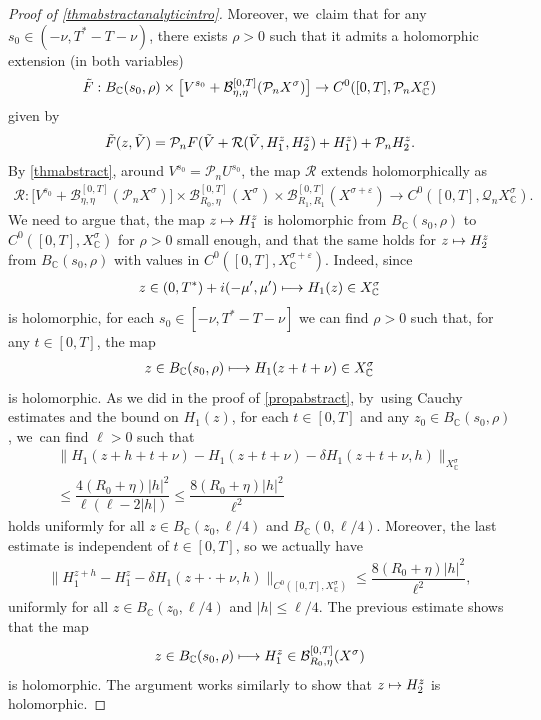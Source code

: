 \documentclass[10pt]{amsart}
\newcommand\mto{\mathchoice{\longmapsto}{\mapsto}{\mapsto}{\mapsto}}
\theoremstyle{definition}
\let\mc\mathcal
\let\veps\varepsilon
\newcommand{\B}{\mc{B}}
\newcommand{\Q}{\mathcal{Q}}
\renewcommand{\P}{\mathcal{P}}
\providecommand{\norm}[1]{\lVert#1\rVert}
\begin{document}
\begin{proof}[Proof of \cref{thmabstractanalyticintro}]
Moreover, we~claim that for any $s_0\in (-\nu,T^*-T-\nu)$, there exists $\rho>0$ such that it admits a holomorphic extension (in both variables)
\begin{align*}
\Tilde{F}: B_{\mathbb{C}}(s_0, \rho)\times \bigl[V^{s_0}+\B_{\eta,\eta}^{[0,T]}(\P_n X^{\sigma})\bigr]\to C^0([0, T], \P_n X_\mathbb{C}^\sigma)
\end{align*}
given by
\begin{align*}
\Tilde{F}(z,\Tilde{V})=\P_n F(\Tilde{V}+\mathcal{R}(\Tilde{V},H_{1}^z,H_{2}^z)+H_{1}^z)+\P_n H_{2}^z.
\end{align*}
By \cref{thmabstract}, around $V^{s_0}=\P_n U^{s_0}$, the map $\mc{R}$ extends holomorphically as
\begin{align*}
\mathcal{R}: \bigl[ V^{s_0}+ \B_{\eta,\eta}^{[0,T]}(\P_n X^{\sigma})\bigr] \times \B_{R_{0},\eta}^{[0,T]}(X^{\sigma}) \times \B_{R_{1},R_{1}}^{[0,T]}(X^{\sigma+\veps}) \to C^0([0, T], \Q_{n }X_\mathbb{C}^{\sigma}).
\end{align*}
We need to argue that, the map $z\mto H_1^z$ is holomorphic from $B_{\mathbb{C}}(s_0, \rho)$ to $C^0([0, T], X_\mathbb{C}^\sigma)$ for $\rho>0$ small enough, and that the same holds for $z\mto H_2^z$ from $B_{\mathbb{C}}(s_0, \rho)$ with values in $C^0([0, T], X_\mathbb{C}^{\sigma+\veps})$. Indeed, since
\begin{align*}
z\in (0, T^*)+i(-\mu', \mu')\mto H_1(z)\in X_\mathbb{C}^\sigma
\end{align*}
is holomorphic, for each $s_0\in [-\nu, T^*-T-\nu]$ we can find $\rho>0$ such that, for any $t\in [0, T]$, the map
\begin{align*}
z\in B_\mathbb{C}(s_0, \rho)\mto H_1(z+t+\nu)\in X_\mathbb{C}^\sigma
\end{align*}
is holomorphic. As we did in the proof of \cref{propabstract}, by~using Cauchy estimates and the bound on $H_1(z)$, for each $t\in [0, T]$ and any $z_0\in B_\mathbb{C}(s_0, \rho)$, we~can find $\ell>0$ such that
\begin{multline*}
\norm{H_1(z+h+t+\nu)-H_1(z+t+\nu)-\delta H_1(z+t+\nu, h)}_{X_\mathbb{C}^\sigma}\\
\leq \dfrac{4(R_0+\eta)|h|^2}{\ell(\ell-2|h|)}\leq \dfrac{8(R_0+\eta)|h|^2}{\ell^2}
\end{multline*}
holds uniformly for all $z\in B_\mathbb{C}(z_0, \ell/4)$ and $B_\mathbb{C}(0, \ell/4)$. Moreover, the last estimate is independent of $t\in [0, T]$, so we actually have
\begin{align*}
\norm{H_1^{z+h}-H_1^z-\delta H_1(z+\cdot+\nu, h)}_{C^0([0, T], X_\mathbb{C}^\sigma)}\leq \dfrac{8(R_0+\eta)|h|^2}{\ell^2},
\end{align*}
uniformly for all $z\in B_\mathbb{C}(z_0, \ell/4)$ and $|h|\leq \ell/4$. The previous estimate shows that the map
\begin{align*}
z\in B_\mathbb{C}(s_0, \rho)\mto H_1^z\in \B_{R_0, \eta}^{[0, T]}(X^\sigma)
\end{align*}
is holomorphic. The argument works similarly to show that $z\mto H_2^z$ is holomorphic.


\end{proof}
\end{document}
